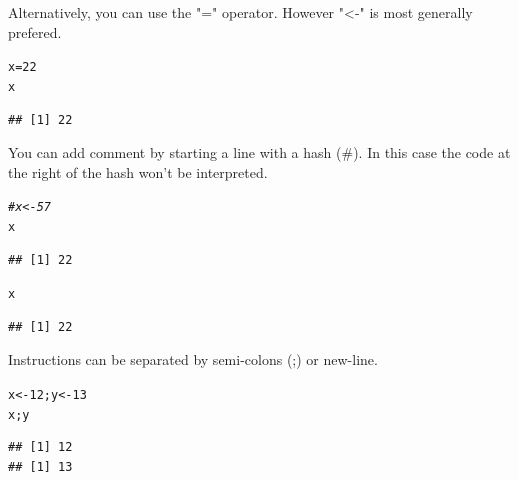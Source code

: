 \documentclass[10pt]{article}\usepackage[]{graphicx}\usepackage[]{color}
\makeatletter
\newcommand{\hlnum}[1]{\textcolor[rgb]{0.686,0.059,0.569}{#1}}%
\newcommand{\hlcom}[1]{\textcolor[rgb]{0.678,0.584,0.686}{\textit{#1}}}%
\newcommand{\hlstd}[1]{\textcolor[rgb]{0.345,0.345,0.345}{#1}}%
\newcommand{\hlkwb}[1]{\textcolor[rgb]{0.69,0.353,0.396}{#1}}%
\newenvironment{kframe}{%
 \def\at@end@of@kframe{}%
 \ifinner\ifhmode%
  \def\at@end@of@kframe{\end{minipage}}%
  \begin{minipage}{\columnwidth}%
 \fi\fi%
 \def\FrameCommand##1{\hskip\@totalleftmargin \hskip-\fboxsep
 \colorbox{shadecolor}{##1}\hskip-\fboxsep
     \hskip-\linewidth \hskip-\@totalleftmargin \hskip\columnwidth}%
 \MakeFramed {\advance\hsize-\width
   \@totalleftmargin\z@ \linewidth\hsize
   \@setminipage}}%
 {\par\unskip\endMakeFramed%
 \at@end@of@kframe}
\newenvironment{knitrout}{}{} %
\makeatother
\begin{document}
\medskip

Alternatively, you can use the "=" operator. However "<-" is most generally prefered.

\begin{knitrout}
\color{fgcolor}\begin{kframe}
\begin{alltt}
\hlstd{x} \hlkwb{=} \hlnum{22}
\hlstd{x}
\end{alltt}
\begin{verbatim}
## [1] 22
\end{verbatim}
\end{kframe}
\end{knitrout}
\medskip


You can add comment by starting a line with a hash (\#). In this case the code at the right of the hash won't be interpreted.

\begin{knitrout}
\color{fgcolor}\begin{kframe}
\begin{alltt}
\hlcom{#x <-  57}
\hlstd{x}
\end{alltt}
\begin{verbatim}
## [1] 22
\end{verbatim}
\end{kframe}
\end{knitrout}


\begin{knitrout}
\color{fgcolor}\begin{kframe}
\begin{alltt}
\hlstd{x}
\end{alltt}
\begin{verbatim}
## [1] 22
\end{verbatim}
\end{kframe}
\end{knitrout}
\medskip

Instructions can be separated by semi-colons (;) or new-line.

\begin{knitrout}
\color{fgcolor}\begin{kframe}
\begin{alltt}
\hlstd{x} \hlkwb{<-} \hlnum{12}\hlstd{; y} \hlkwb{<-} \hlnum{13}
\hlstd{x;y}
\end{alltt}
\begin{verbatim}
## [1] 12
## [1] 13
\end{verbatim}
\end{kframe}
\end{knitrout}
\end{document}
